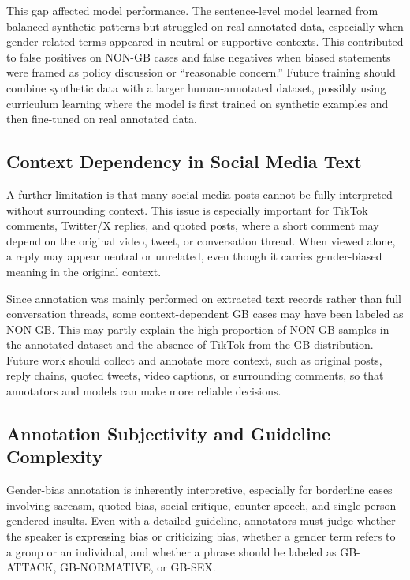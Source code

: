 \documentclass[12pt,oneside,openright,a4paper]{cpe-english-project}
\begin{document}
This gap affected model performance. The sentence-level model learned from balanced synthetic patterns but struggled on real annotated data, especially when gender-related terms appeared in neutral or supportive contexts. This contributed to false positives on NON-GB cases and false negatives when biased statements were framed as policy discussion or ``reasonable concern.'' Future training should combine synthetic data with a larger human-annotated dataset, possibly using curriculum learning where the model is first trained on synthetic examples and then fine-tuned on real annotated data.

\subsection{Context Dependency in Social Media Text}

A further limitation is that many social media posts cannot be fully interpreted without surrounding context. This issue is especially important for TikTok comments, Twitter/X replies, and quoted posts, where a short comment may depend on the original video, tweet, or conversation thread. When viewed alone, a reply may appear neutral or unrelated, even though it carries gender-biased meaning in the original context.

Since annotation was mainly performed on extracted text records rather than full conversation threads, some context-dependent GB cases may have been labeled as NON-GB. This may partly explain the high proportion of NON-GB samples in the annotated dataset and the absence of TikTok from the GB distribution. Future work should collect and annotate more context, such as original posts, reply chains, quoted tweets, video captions, or surrounding comments, so that annotators and models can make more reliable decisions.

\subsection{Annotation Subjectivity and Guideline Complexity}

Gender-bias annotation is inherently interpretive, especially for borderline cases involving sarcasm, quoted bias, social critique, counter-speech, and single-person gendered insults. Even with a detailed guideline, annotators must judge whether the speaker is expressing bias or criticizing bias, whether a gender term refers to a group or an individual, and whether a phrase should be labeled as GB-ATTACK, GB-NORMATIVE, or GB-SEX.
\end{document}

